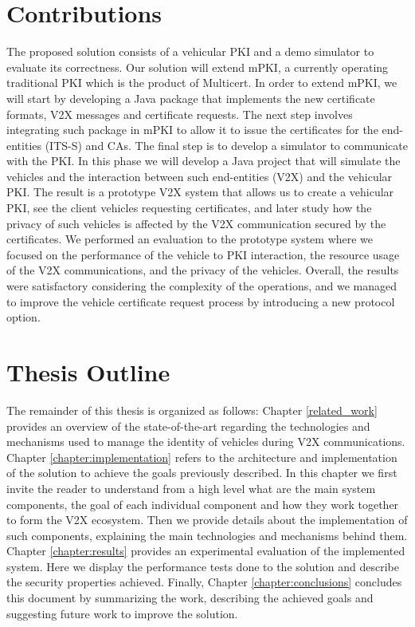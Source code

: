 
\section{Contributions}
\label{contributions}
The proposed solution consists of a vehicular PKI and a demo simulator to evaluate its correctness. Our solution will extend mPKI, a currently operating traditional PKI which is the product of Multicert. In order to extend mPKI, we will start by developing a Java package that implements the new certificate formats, V2X messages and certificate requests. The next step involves integrating such package in mPKI to allow it to issue the certificates for the end-entities (ITS-S) and CAs. The final step is to develop a simulator to communicate with the PKI. In this phase we will develop a Java project that will simulate the vehicles and the interaction between such end-entities (V2X) and the vehicular PKI. The result is a prototype V2X system that allows us to create a vehicular PKI, see the client vehicles requesting certificates, and later study how the privacy of such vehicles is affected by the V2X communication secured by the certificates. We performed an evaluation to the prototype system where we focused on the performance of the vehicle to PKI interaction, the resource usage of the V2X communications, and the privacy of the vehicles. Overall, the results were satisfactory considering the complexity of the operations, and we managed to improve the vehicle certificate request process by introducing a new protocol option.



\section{Thesis Outline}
\label{section:outline}

The remainder of this thesis is organized as follows: Chapter \ref{related_work} provides an overview of the state-of-the-art regarding the technologies and mechanisms used to manage the identity of vehicles during V2X communications. Chapter \ref{chapter:implementation} refers to the architecture and implementation of the solution to achieve the goals previously described. In this chapter we first invite the reader to understand from a high level what are the main system components, the goal of each individual component and how they work together to form the V2X ecosystem. Then we provide details about the implementation of such components, explaining the main technologies and mechanisms behind them. Chapter \ref{chapter:results} provides an experimental evaluation of the implemented system. Here we display the performance tests done to the solution and describe the security properties achieved. Finally, Chapter \ref{chapter:conclusions} concludes this document by summarizing the work, describing the achieved goals and suggesting future work to improve the solution.
